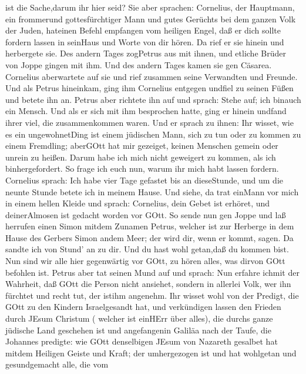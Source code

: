 ist die Sache,darum ihr hier seid?  Sie aber sprachen:
Cornelius, der Hauptmann, ein frommerund gottesfürchtiger Mann und gutes
Gerüchts bei dem ganzen Volk der Juden, hateinen Befehl empfangen vom
heiligen Engel, daß er dich sollte fordern lassen in seinHaus und Worte
von dir hören.  Da rief er sie hinein und herbergete sie.
Des andern Tages zogPetrus aus mit ihnen, und etliche Brüder von Joppe
gingen mit ihm.  Und des andern Tages kamen sie gen
Cäsarea. Cornelius aberwartete auf sie und rief zusammen seine
Verwandten und Freunde.  Und als Petrus hineinkam, ging ihm
Cornelius entgegen undfiel zu seinen Füßen und betete ihn an.
 Petrus aber richtete ihn auf und sprach: Stehe auf; ich
binauch ein Mensch.  Und als er sich mit ihm besprochen
hatte, ging er hinein undfand ihrer viel, die zusammenkommen waren.
 Und er sprach zu ihnen: Ihr wisset, wie es ein
ungewohnetDing ist einem jüdischen Mann, sich zu tun oder zu kommen zu
einem Fremdling; aberGOtt hat mir gezeiget, keinen Menschen gemein oder
unrein zu heißen.  Darum habe ich mich nicht geweigert zu
kommen, als ich binhergefordert. So frage ich euch nun, warum ihr mich
habt lassen fordern.  Cornelius sprach: Ich habe vier Tage
gefastet bis an dieseStunde, und um die neunte Stunde betete ich in
meinem Hause. Und siehe, da trat einMann vor mich in einem hellen Kleide
 und sprach: Cornelius, dein Gebet ist erhöret, und
deinerAlmosen ist gedacht worden vor GOtt.  So sende nun
gen Joppe und laß herrufen einen Simon mitdem Zunamen Petrus, welcher
ist zur Herberge in dem Hause des Gerbers Simon andem Meer; der wird
dir, wenn er kommt, sagen.  Da sandte ich von Stund' an zu
dir. Und du hast wohl getan,daß du kommen bist. Nun sind wir alle hier
gegenwärtig vor GOtt, zu hören alles, was dirvon GOtt befohlen ist.
 Petrus aber tat seinen Mund auf und sprach: Nun erfahre
ichmit der Wahrheit, daß GOtt die Person nicht ansiehet, 
sondern in allerlei Volk, wer ihn fürchtet und recht tut, der istihm
angenehm.  Ihr wisset wohl von der Predigt, die GOtt zu den
Kindern Israelgesandt hat, und verkündigen lassen den Frieden durch
JEsum Christum ( welcher ist einHErr über alles),  die
durchs ganze jüdische Land geschehen ist und angefangenin Galiläa nach
der Taufe, die Johannes predigte:  wie GOtt denselbigen
JEsum von Nazareth gesalbet hat mitdem Heiligen Geiste und Kraft; der
umhergezogen ist und hat wohlgetan und gesundgemacht alle, die vom
